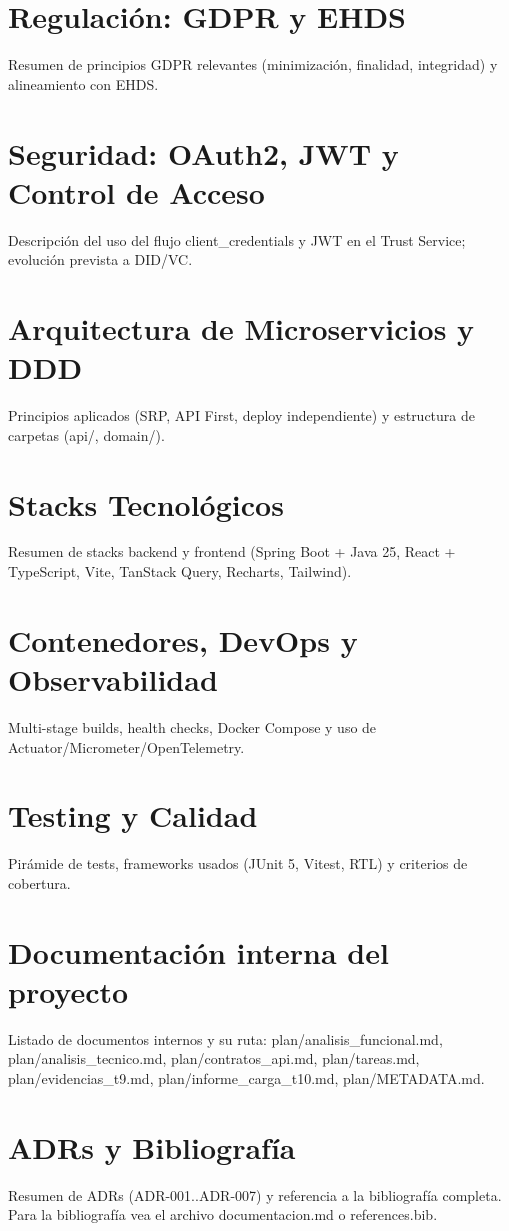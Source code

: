 \section{Regulación: GDPR y EHDS}
Resumen de principios GDPR relevantes (minimización, finalidad, integridad) y alineamiento con EHDS.

\section{Seguridad: OAuth2, JWT y Control de Acceso}
Descripción del uso del flujo client\_credentials y JWT en el Trust Service; evolución prevista a DID/VC.

\section{Arquitectura de Microservicios y DDD}
Principios aplicados (SRP, API First, deploy independiente) y estructura de carpetas (api/, domain/).

\section{Stacks Tecnológicos}
Resumen de stacks backend y frontend (Spring Boot + Java 25, React + TypeScript, Vite, TanStack Query, Recharts, Tailwind).

\section{Contenedores, DevOps y Observabilidad}
Multi-stage builds, health checks, Docker Compose y uso de Actuator/Micrometer/OpenTelemetry.

\section{Testing y Calidad}
Pir\'amide de tests, frameworks usados (JUnit 5, Vitest, RTL) y criterios de cobertura.

\section{Documentación interna del proyecto}
Listado de documentos internos y su ruta: plan/analisis_funcional.md, plan/analisis_tecnico.md, plan/contratos_api.md, plan/tareas.md, plan/evidencias_t9.md, plan/informe_carga_t10.md, plan/METADATA.md.

\section{ADRs y Bibliografía}
Resumen de ADRs (ADR-001..ADR-007) y referencia a la bibliografía completa. Para la bibliografía vea el archivo documentacion.md o references.bib.


